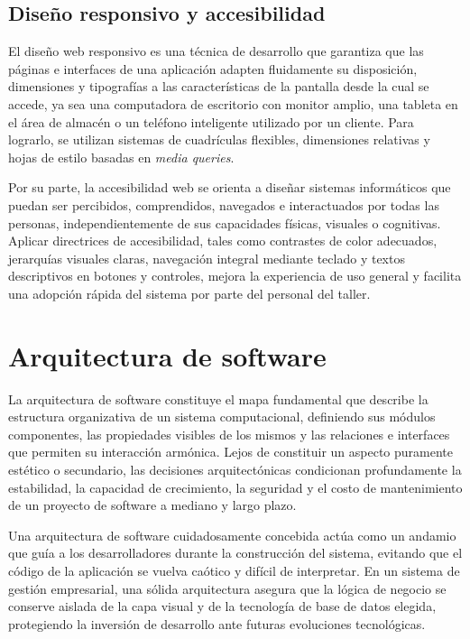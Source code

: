 \subsection{Diseño responsivo y accesibilidad}

El diseño web responsivo es una técnica de desarrollo que garantiza que las páginas e interfaces de una aplicación adapten fluidamente su disposición, dimensiones y tipografías a las características de la pantalla desde la cual se accede, ya sea una computadora de escritorio con monitor amplio, una tableta en el área de almacén o un teléfono inteligente utilizado por un cliente. Para lograrlo, se utilizan sistemas de cuadrículas flexibles, dimensiones relativas y hojas de estilo basadas en \textit{media queries}.

Por su parte, la accesibilidad web se orienta a diseñar sistemas informáticos que puedan ser percibidos, comprendidos, navegados e interactuados por todas las personas, independientemente de sus capacidades físicas, visuales o cognitivas. Aplicar directrices de accesibilidad, tales como contrastes de color adecuados, jerarquías visuales claras, navegación integral mediante teclado y textos descriptivos en botones y controles, mejora la experiencia de uso general y facilita una adopción rápida del sistema por parte del personal del taller.

\section{Arquitectura de software}

La arquitectura de software constituye el mapa fundamental que describe la estructura organizativa de un sistema computacional, definiendo sus módulos componentes, las propiedades visibles de los mismos y las relaciones e interfaces que permiten su interacción armónica. Lejos de constituir un aspecto puramente estético o secundario, las decisiones arquitectónicas condicionan profundamente la estabilidad, la capacidad de crecimiento, la seguridad y el costo de mantenimiento de un proyecto de software a mediano y largo plazo.

Una arquitectura de software cuidadosamente concebida actúa como un andamio que guía a los desarrolladores durante la construcción del sistema, evitando que el código de la aplicación se vuelva caótico y difícil de interpretar. En un sistema de gestión empresarial, una sólida arquitectura asegura que la lógica de negocio se conserve aislada de la capa visual y de la tecnología de base de datos elegida, protegiendo la inversión de desarrollo ante futuras evoluciones tecnológicas.

